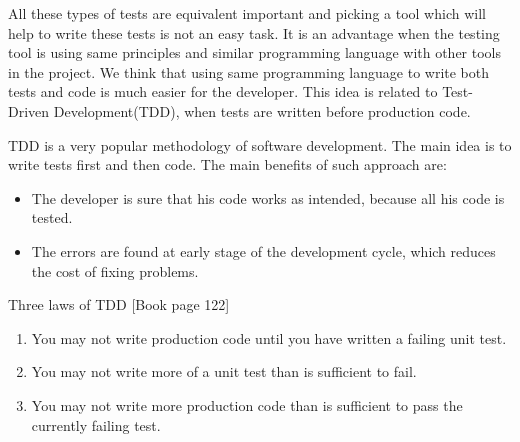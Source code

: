 		All these types of tests are equivalent important and picking a tool which
		will help to write these tests is not an easy task. It is an advantage when
		the testing tool is using same principles and similar programming language
		with other tools in the project. We think that using same programming language
		to write both tests and code is much easier for the developer. This idea is
		related to Test-Driven Development(TDD), when tests are written
		before production code.
		
		TDD is a very popular methodology of software development. The main idea is to
		write tests first and then code. The main benefits of such approach are:
			\begin{itemize}
			  \item The developer is sure that his code works as intended, because all
			  his code is tested.
				\item The errors are found at early stage of the development cycle, which
				reduces the cost of fixing problems.
			\end{itemize}
			
			Three laws of TDD \cite[pp122]{Cleancode}[Book page 122]
				\begin{enumerate}
				  \item You may not write production code until you have written a failing unit	test.
				  \item You may not write more of a unit test than is sufficient to fail.
				  \item You may not write more production code than is sufficient to pass the
				currently failing test.
				\end{enumerate}
			\iffalse	
					\subsection {Approaches in Web Testing}	
						\begin{textit}
							In this chapter I will explain
							what does testing actually meands. What types of testing exist: unit, integration, user-interface, regression,
						etc. What are the differences between these types of testing.
						
						Next I will prove why testing is so important in software development. Here I
						would like to mention some information about \textit{Quality control}. The
						idea is to show that testing increases the speed of software
						development and also improves it's quality. So in terms of quality control testing will
						decrease the price and increase the value of the product for the end user.
						
						Also I want to mention other methodologies like \textit{Agile development},
						\textit{User experience design} and \textit{Test Driven Development}. And how
						testing can be used/integrated with these methodologies/processes.
						\end{textit}
			\fi